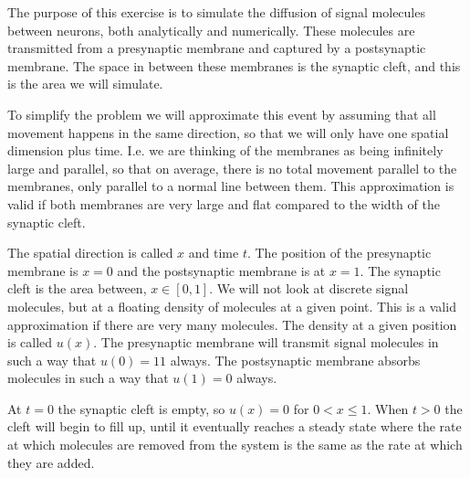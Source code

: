 The purpose of this exercise is to simulate the diffusion of signal molecules between neurons, both analytically and numerically. These molecules are transmitted from a presynaptic membrane and captured by a postsynaptic membrane. The space in between these membranes is the synaptic cleft, and this is the area we will simulate.

To simplify the problem we will approximate this event by assuming that all movement happens in the same direction, so that we will only have one spatial dimension plus time. I.e. we are thinking of the membranes as being infinitely large and parallel, so that on average, there is no total movement parallel to the membranes, only parallel to a normal line between them. This approximation is valid if both membranes are very large and flat compared to the width of the synaptic cleft.

The spatial direction is called $x$ and time $t$. The position of the presynaptic membrane is $x=0$ and the postsynaptic membrane is at $x=1$. The synaptic cleft is the area between, $x \in [0,1]$. We will not look at discrete signal molecules, but at a floating density of molecules at a given point. This is a valid approximation if there are very many molecules. The density at a given position is called $u(x)$. The presynaptic membrane will transmit signal molecules in such a way that $u(0)=11$ always. The postsynaptic membrane absorbs molecules in such a way that $u(1)=0$ always.

At $t=0$ the synaptic cleft is empty, so $u(x)=0$  for $0 < x \leq 1$. When $t > 0$ the cleft will begin to fill up, until it eventually reaches a steady state where the rate at which molecules are removed from the system is the same as the rate at which they are added.
